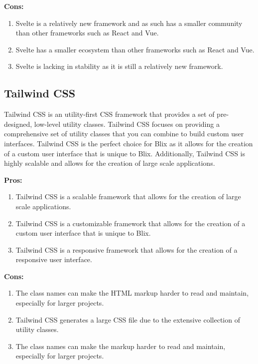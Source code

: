 \documentclass[11pt,a4paper]{article}
\begin{document}
\textbf{Cons:}
\begin{enumerate}[label*=\arabic*.]
	\item[\textbullet] Svelte is a relatively new framework and as such has a
	smaller community than other frameworks such as React and Vue.
	\item[\textbullet] Svelte has a smaller ecosystem than other frameworks such
	as React and Vue.
	\item[\textbullet] Svelte is lacking in stability as it is still a
	relatively new framework.
\end{enumerate}

\subsection{Tailwind CSS}
Tailwind CSS is an utility-first CSS framework that provides a set of
pre-designed, low-level utility classes. Tailwind CSS focuses on providing a
comprehensive set of utility classes that you can combine to build custom user
interfaces. Tailwind CSS is the perfect choice for Blix as it allows for the
creation of a custom user interface that is unique to Blix. Additionally,
Tailwind CSS is highly scalable and allows for the creation of large scale
applications.

\textbf{Pros:}
\begin{enumerate}[label*=\arabic*.]
	\item[\textbullet] Tailwind CSS is a scalable framework that allows for the
	creation of large scale applications.
	\item[\textbullet] Tailwind CSS is a customizable framework that allows for
	the creation of a custom user interface that is unique to Blix.
	\item[\textbullet] Tailwind CSS is a responsive framework that allows for
	the creation of a responsive user interface.
\end{enumerate}

\textbf{Cons:}
\begin{enumerate}[label*=\arabic*.]
	\item[\textbullet] The class names can make the HTML markup harder to read
	and maintain, especially for larger projects.
	\item[\textbullet] Tailwind CSS generates a large CSS file due to the
	extensive collection of utility classes. 
	\item[\textbullet] The class names can make the markup harder to read and
	maintain, especially for larger projects.
\end{enumerate}
\end{document}

